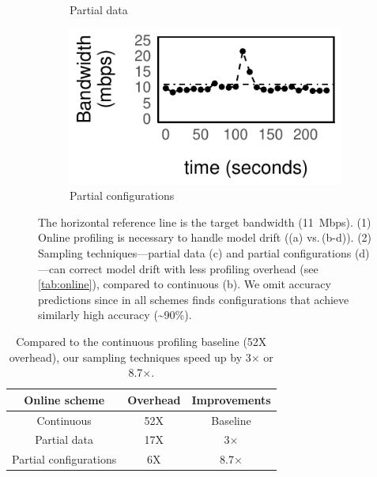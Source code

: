 \begin{figure}
\begin{subfigure}[t]{0.49\columnwidth}
    \caption{Partial data}
    \label{fig:online-partial}
  \end{subfigure}
  \hfill
  \begin{subfigure}[t]{0.49\columnwidth}
    \includegraphics[width=\textwidth]{figures/online4.pdf}
    \caption{Partial configurations}
    \label{fig:online-trigger}
  \end{subfigure}
  \caption{The horizontal reference line is the target bandwidth
    (\SI{11}{Mbps}). (1) Online profiling is necessary to handle model drift
    ((a) vs.\,(b-d)). (2) Sampling techniques---partial data (c) and partial
    configurations (d)---can correct model drift with less profiling overhead
    (see \autoref{tab:online}), compared to continuous (b).  We omit accuracy
    predictions since in all schemes \sysname{} finds configurations that
    achieve similarly high accuracy (\textasciitilde 90\%).  }
  \label{fig:online-tricks}
\end{figure}


\begin{table}[t]
  \footnotesize
  \centering
  \begin{tabular}{c c c}
    \toprule
    Online scheme & Overhead & Improvements \\
    \midrule
    Continuous & 52X & Baseline \\
    Partial data & 17X & 3$\times$\\
    Partial configurations & 6X & 8.7$\times$ \\
    \bottomrule
  \end{tabular}
  \caption{Compared to the continuous profiling baseline (52X overhead), our
    sampling techniques speed up by 3$\times$ or 8.7$\times$.}
  \label{tab:online}
  \vspace{-1em}
\end{table}

